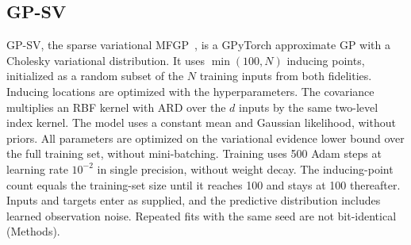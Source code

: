 \subsection{GP-SV}

GP-SV, the sparse variational MFGP~\citep{titsias2009variational,hensman2013gaussian}, is a GPyTorch approximate GP with a Cholesky variational distribution. It uses $\min(100, N)$ inducing points, initialized as a random subset of the $N$ training inputs from both fidelities. Inducing locations are optimized with the hyperparameters. The covariance multiplies an RBF kernel with ARD over the $d$ inputs by the same two-level index kernel. The model uses a constant mean and Gaussian likelihood, without priors. All parameters are optimized on the variational evidence lower bound over the full training set, without mini-batching. Training uses 500 Adam steps at learning rate $10^{-2}$ in single precision, without weight decay. The inducing-point count equals the training-set size until it reaches 100 and stays at 100 thereafter. Inputs and targets enter as supplied, and the predictive distribution includes learned observation noise. Repeated fits with the same seed are not bit-identical (Methods).


